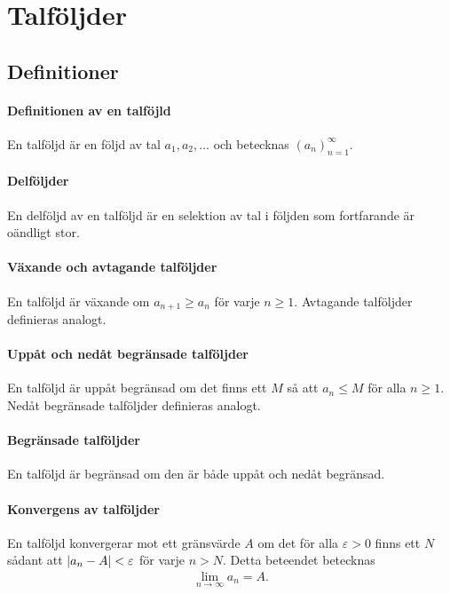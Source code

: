 \section{Talföljder}

\subsection{Definitioner}

\paragraph{Definitionen av en talföjld}
En talföljd är en följd av tal $a_1, a_2, ...$ och betecknas $\left(a_n\right)_{n = 1}^\infty$.

\paragraph{Delföljder}
En delföljd av en talföljd är en selektion av tal i följden som fortfarande är oändligt stor.

\paragraph{Växande och avtagande talföljder}
En talföljd är växande om $a_{n + 1} \geq a_n$ för varje $n \geq 1$. Avtagande talföljder definieras analogt.

\paragraph{Uppåt och nedåt begränsade talföljder}
En talföljd är uppåt begränsad om det finns ett $M$ så att $a_n \leq M$ för alla $n \geq 1$. Nedåt begränsade talföljder definieras analogt.

\paragraph{Begränsade talföljder}
En talföljd är begränsad om den är både uppåt och nedåt begränsad.

\paragraph{Konvergens av talföljder}
En talföljd konvergerar mot ett gränsvärde $A$ om det för alla $\varepsilon > 0$ finns ett $N$ sådant att $\abs{a_n - A} < \varepsilon$ för varje $n > N$. Detta beteendet betecknas
\begin{align*}
	\lim_{n\to\infty} a_n = A.
\end{align*}

